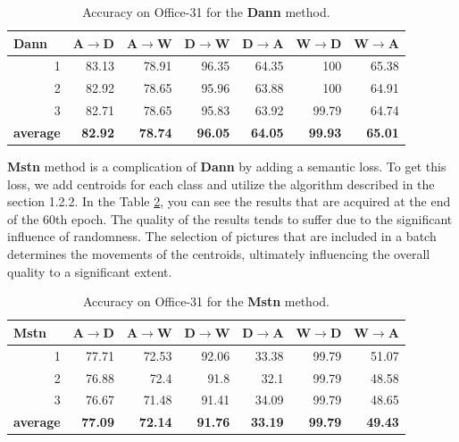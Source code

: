 \begin{table}[h]
\centering
\caption{Accuracy on Office-31 for the \textbf{Dann} method.}
\label{tab:dann}
\begin{tabular}{|r|r|r|r|r|r|r|}
\hline
\multicolumn{1}{|l|}{Dann} & \multicolumn{1}{l|}{A$\rightarrow$D} & \multicolumn{1}{l|}{A$\rightarrow$W} & \multicolumn{1}{l|}{D$\rightarrow$W} & \multicolumn{1}{l|}{D$\rightarrow$A} & \multicolumn{1}{l|}{W$\rightarrow$D} & \multicolumn{1}{l|}{W$\rightarrow$A} \\ \hline
1 & 83.13 & 78.91 & 96.35 & 64.35 & 100 & 65.38 \\ \hline
2 & 82.92 & 78.65 & 95.96 & 63.88 & 100 & 64.91 \\ \hline
3 & 82.71 & 78.65 & 95.83 & 63.92 & 99.79 & 64.74 \\ \hline
\multicolumn{1}{|l|}{\textbf{average}} & \textbf{82.92} & \textbf{78.74} & \textbf{96.05} & \textbf{64.05} & \textbf{99.93} & \textbf{65.01} \\ \hline
\end{tabular}
\end{table}

\textbf{Mstn} method is a complication of \textbf{Dann} by adding a semantic loss. To get this loss, we add centroids for each class and utilize the algorithm described in the section 1.2.2. In the Table \ref{tab:mstn}, you can see the results that are acquired at the end of the 60th epoch. The quality of the results tends to suffer due to the significant influence of randomness.  The selection of pictures that are included in a batch determines the movements of the centroids, ultimately influencing the overall quality to a significant extent.

\begin{table}[h]
\centering
\caption{Accuracy on Office-31 for the \textbf{Mstn} method.}
\label{tab:mstn}
\begin{tabular}{|r|r|r|r|r|r|r|}
\hline
\multicolumn{1}{|l|}{Mstn} & \multicolumn{1}{l|}{A$\rightarrow$D} & \multicolumn{1}{l|}{A$\rightarrow$W} & \multicolumn{1}{l|}{D$\rightarrow$W} & \multicolumn{1}{l|}{D$\rightarrow$A} & \multicolumn{1}{l|}{W$\rightarrow$D} & \multicolumn{1}{l|}{W$\rightarrow$A} \\ \hline
1 & 77.71 & 72.53 & 92.06 & 33.38 & 99.79 & 51.07 \\ \hline
2 & 76.88 & 72.4 & 91.8 & 32.1 & 99.79 & 48.58 \\ \hline
3 & 76.67 & 71.48 & 91.41 & 34.09 & 99.79 & 48.65 \\ \hline
\multicolumn{1}{|l|}{\textbf{average}} & \textbf{77.09} & \textbf{72.14} & \textbf{91.76} & \textbf{33.19} & \textbf{99.79} & \textbf{49.43} \\ \hline
\end{tabular}
\end{table}

